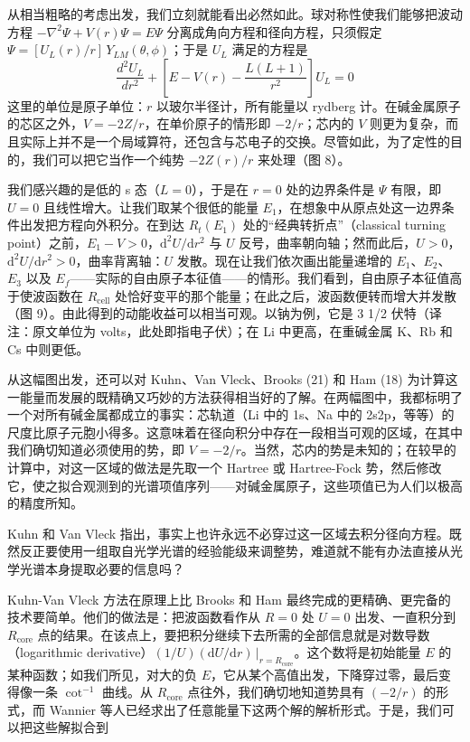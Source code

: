 从相当粗略的考虑出发，我们立刻就能看出必然如此。球对称性使我们能够把波动方程 $-\nabla^2\Psi+V(r)\Psi=E\Psi$ 分离成角向方程和径向方程，只须假定 $\Psi=[U_L(r)/r]\,Y_{LM}(\theta,\phi)$；于是 $U_L$ 满足的方程是
\begin{equation*}
\frac{d^2 U_L}{dr^2}+\left[E-V(r)-\frac{L(L+1)}{r^2}\right]U_L=0
\end{equation*}
这里的单位是原子单位：$r$ 以玻尔半径计，所有能量以 rydberg 计。在碱金属原子的芯区之外，$V=-2Z/r$，在单价原子的情形即 $-2/r$；芯内的 $V$ 则更为复杂，而且实际上并不是一个局域算符，还包含与芯电子的交换。尽管如此，为了定性的目的，我们可以把它当作一个纯势 $-2Z(r)/r$ 来处理（图 8）。


我们感兴趣的是低的 s 态（$L=0$），于是在 $r=0$ 处的边界条件是 $\Psi$ 有限，即 $U=0$ 且线性增大。让我们取某个很低的能量 $E_1$，在想象中从原点处这一边界条件出发把方程向外积分。在到达 $R_t(E_1)$ 处的“经典转折点”（classical turning point）之前，$E_1-V>0$，$\mathrm{d}^2U/\mathrm{d}r^2$ 与 $U$ 反号，曲率朝向轴；然而此后，$U>0$，$\mathrm{d}^2U/\mathrm{d}r^2>0$，曲率背离轴：$U$ 发散。现在让我们依次画出能量递增的 $E_1$、$E_2$、$E_3$ 以及 $E_f$——实际的自由原子本征值——的情形。我们看到，自由原子本征值高于使波函数在 $R_{\mathrm{cell}}$ 处恰好变平的那个能量；在此之后，波函数便转而增大并发散（图 9）。由此得到的动能收益可以相当可观。以钠为例，它是 3 1/2 伏特（译注：原文单位为 volts，此处即指电子伏）；在 Li 中更高，在重碱金属 K、Rb 和 Cs 中则更低。


从这幅图出发，还可以对 Kuhn、Van Vleck、Brooks (21) 和 Ham (18) 为计算这一能量而发展的既精确又巧妙的方法获得相当好的了解。在两幅图中，我都标明了一个对所有碱金属都成立的事实：芯轨道（Li 中的 1s、Na 中的 2s2p，等等）的尺度比原子元胞小得多。这意味着在径向积分中存在一段相当可观的区域，在其中我们确切知道必须使用的势，即 $V=-2/r$。当然，芯内的势是未知的；在较早的计算中，对这一区域的做法是先取一个 Hartree 或 Hartree-Fock 势，然后修改它，使之拟合观测到的光谱项值序列——对碱金属原子，这些项值已为人们以极高的精度所知。

Kuhn 和 Van Vleck 指出，事实上也许永远不必穿过这一区域去积分径向方程。既然反正要使用一组取自光学光谱的经验能级来调整势，难道就不能有办法直接从光学光谱本身提取必要的信息吗？

Kuhn-Van Vleck 方法在原理上比 Brooks 和 Ham 最终完成的更精确、更完备的技术要简单。他们的做法是：把波函数看作从 $R=0$ 处 $U=0$ 出发、一直积分到 $R_{\mathrm{core}}$ 点的结果。在该点上，要把积分继续下去所需的全部信息就是对数导数（logarithmic derivative）$(1/U)(\mathrm{d}U/\mathrm{d}r)\,\big|_{r=R_{\mathrm{core}}}$。这个数将是初始能量 $E$ 的某种函数；如我们所见，对大的负 $E$，它从某个高值出发，下降穿过零，最后变得像一条 $\cot^{-1}$ 曲线。从 $R_{\mathrm{core}}$ 点往外，我们确切地知道势具有 $(-2/r)$ 的形式，而 Wannier 等人已经求出了任意能量下这两个解的解析形式。于是，我们可以把这些解拟合到

